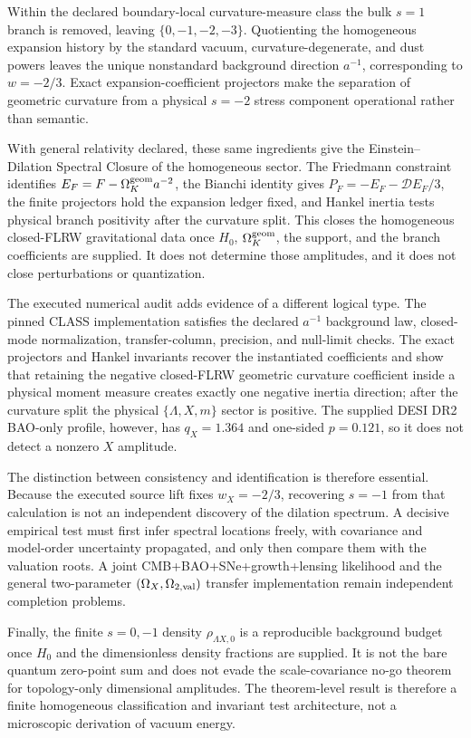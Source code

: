 \documentclass[aps,prd,preprint,onecolumn,nofootinbib,superscriptaddress,showkeys]{revtex4-2}
\numberwithin{equation}{section}
\theoremstyle{definition}
\theoremstyle{plain}
\newcommand{\Dil}{\mathscr D}
\begin{document}
Within the declared boundary-local curvature-measure class the bulk \(s=1\) branch is removed, leaving \(\{0,-1,-2,-3\}\).  Quotienting the homogeneous expansion history by the standard vacuum, curvature-degenerate, and dust powers leaves the unique nonstandard background direction \(a^{-1}\), corresponding to \(w=-2/3\).  Exact expansion-coefficient projectors make the separation of geometric curvature from a physical \(s=-2\) stress component operational rather than semantic.

With general relativity declared, these same ingredients give the Einstein--Dilation Spectral Closure of the homogeneous sector.  The Friedmann constraint identifies \(E_F=F-\Omega_K^{\rm geom}a^{-2}\), the Bianchi identity gives \(P_F=-E_F-\Dil E_F/3\), the finite projectors hold the expansion ledger fixed, and Hankel inertia tests physical branch positivity after the curvature split.  This closes the homogeneous closed-FLRW gravitational data once \(H_0\), \(\Omega_K^{\rm geom}\), the support, and the branch coefficients are supplied.  It does not determine those amplitudes, and it does not close perturbations or quantization.

The executed numerical audit adds evidence of a different logical type.  The pinned CLASS implementation satisfies the declared \(a^{-1}\) background law, closed-mode normalization, transfer-column, precision, and null-limit checks.  The exact projectors and Hankel invariants recover the instantiated coefficients and show that retaining the negative closed-FLRW geometric curvature coefficient inside a physical moment measure creates exactly one negative inertia direction; after the curvature split the physical \(\{\Lambda,X,m\}\) sector is positive.  The supplied DESI DR2 BAO-only profile, however, has \(q_X=1.364\) and one-sided \(p=0.121\), so it does not detect a nonzero \(X\) amplitude.

The distinction between consistency and identification is therefore essential.  Because the executed source lift fixes \(w_X=-2/3\), recovering \(s=-1\) from that calculation is not an independent discovery of the dilation spectrum.  A decisive empirical test must first infer spectral locations freely, with covariance and model-order uncertainty propagated, and only then compare them with the valuation roots.  A joint CMB+BAO+SNe+growth+lensing likelihood and the general two-parameter \((\Omega_X,\Omega_{2,{\rm val}})\) transfer implementation remain independent completion problems.

Finally, the finite \(s=0,-1\) density \(\rho_{\Lambda X,0}\) is a reproducible background budget once \(H_0\) and the dimensionless density fractions are supplied.  It is not the bare quantum zero-point sum and does not evade the scale-covariance no-go theorem for topology-only dimensional amplitudes.  The theorem-level result is therefore a finite homogeneous classification and invariant test architecture, not a microscopic derivation of vacuum energy.
\end{document}
